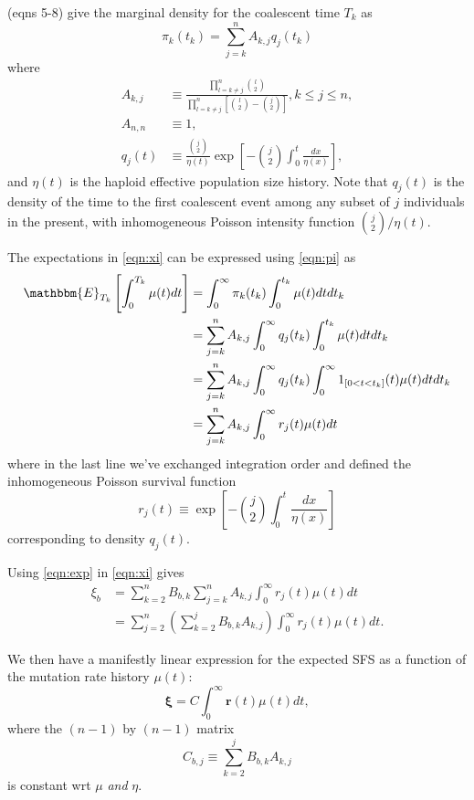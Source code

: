 \documentclass[11pt]{article}
\begin{document}
\cite{Polanski2003-kg} (eqns 5-8) give the marginal density for the coalescent time $T_k$ as
\begin{equation}
\label{eqn:pi}
\pi_k(t_k) = \sum_{j=k}^n A_{k,j} q_j(t_k)
\end{equation}
where
\begin{align*}
A_{k,j} &\equiv \frac{\prod_{l=k\ne j}^{n}\binom{l}{2}}{\prod_{l=k\ne j}^{n}\left[\binom{l}{2}-\binom{j}{2}\right]}, k\le j\le n,\\
A_{n,n} &\equiv 1,\\
q_j(t) &\equiv \frac{\binom{j}{2}}{\eta(t)}\exp\left[-\binom{j}{2}\int_0^t\frac{dx}{\eta(x)}\right],
\end{align*}
and $\eta(t)$ is the haploid effective population size history.
Note that $q_j(t)$ is the density of the time to the first coalescent event among any subset of $j$ individuals in the present, with inhomogeneous Poisson intensity function $\binom{j}{2}/\eta(t)$.

The expectations in \eqref{eqn:xi} can be expressed using \eqref{eqn:pi} as
\begin{align}
\label{eqn:exp}
\mathbbm{E}_{T_k}\left[\int_0^{T_k}\mu(t)dt\right] &= \int_0^\infty\pi_k(t_k)\int_0^{t_k}\mu(t)dt dt_k\nonumber\\
&= \sum_{j=k}^n A_{k,j}\int_0^\infty q_j(t_k)\int_0^{t_k}\mu(t)dt dt_k\nonumber\\
&= \sum_{j=k}^n A_{k,j}\int_0^\infty q_j(t_k)\int_0^\infty 1_{[0<t<t_k]}(t)\mu(t)dt dt_k\nonumber\\
&= \sum_{j=k}^n A_{k,j}\int_0^\infty r_j(t)\mu(t)dt
\end{align}
where in the last line we've exchanged integration order and defined the inhomogeneous Poisson survival function
\begin{equation}
\label{eqn:r}
r_j(t) \equiv \exp\left[-\binom{j}{2}\int_0^t\frac{dx}{\eta(x)}\right]
\end{equation}
corresponding to density $q_j(t)$.

Using \eqref{eqn:exp} in \eqref{eqn:xi} gives
\begin{align}
\label{eqn:xi2}
\xi_b &= \sum_{k=2}^n B_{b,k} \sum_{j=k}^n A_{k,j}\int_0^\infty r_j(t)\mu(t)dt\nonumber\\
&= \sum_{j=2}^n \left(\sum_{k=2}^j B_{b,k} A_{k,j}\right) \int_0^\infty r_j(t)\mu(t)dt.
\end{align}

We then have a manifestly linear expression for the expected SFS as a function of the mutation rate history $\mu(t)$:
\begin{equation}
\label{eqn:xivec}
\boldsymbol\xi = C \int_0^\infty \boldsymbol r(t)\mu(t)dt,
\end{equation}
where the $(n-1)$ by $(n-1)$ matrix
\[
C_{b,j} \equiv \sum_{k=2}^j B_{b,k} A_{k,j}
\]
is constant wrt $\mu$ \emph{and} $\eta$.
\end{document}
